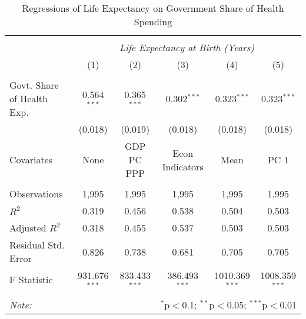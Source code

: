 \begin{table}[!htbp] \centering
  \caption{Regressions of Life Expectancy on Government Share of Health Spending \label{main_regs}}
\begin{tabular}{@{\extracolsep{5pt}}lccccc}
\\[-1.8ex]\hline
\hline \\[-1.8ex]
& \multicolumn{5}{c}{\textit{Life Expectancy at Birth (Years)}} \
\cr \
\\[-1.8ex] & (1) & (2) & (3) & (4) & (5) \\
\hline \\[-1.8ex]
 Govt. Share of Health Exp. & 0.564$^{***}$ & 0.365$^{***}$ & 0.302$^{***}$ & 0.323$^{***}$ & 0.323$^{***}$ \\
  & (0.018) & (0.019) & (0.018) & (0.018) & (0.018) \\
 Covariates & None & GDP PC PPP & Econ Indicators & Mean & PC 1 \\
\hline \\[-1.8ex]
 Observations & 1,995 & 1,995 & 1,995 & 1,995 & 1,995 \\
 $R^2$ & 0.319 & 0.456 & 0.538 & 0.504 & 0.503 \\
 Adjusted $R^2$ & 0.318 & 0.455 & 0.537 & 0.503 & 0.503 \\
 Residual Std. Error & 0.826 & 0.738 & 0.681 & 0.705 & 0.705  \\
 F Statistic & 931.676$^{***}$  & 833.433$^{***}$  & 386.493$^{***}$  & 1010.369$^{***}$  & 1008.359$^{***}$  \\
\hline
\hline \\[-1.8ex]
\textit{Note:} & \multicolumn{5}{r}{$^{*}$p$<$0.1; $^{**}$p$<$0.05; $^{***}$p$<$0.01} \\
\end{tabular}
\end{table}